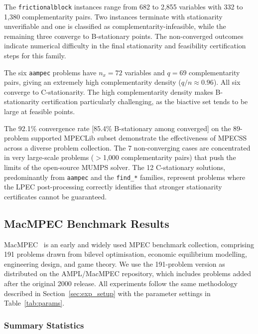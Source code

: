 The \texttt{frictionalblock} instances range from 682 to 2,855 variables
with 332 to 1,380 complementarity pairs.  Two instances terminate with
stationarity unverifiable and one is classified as complementarity-infeasible,
while the remaining three converge to B-stationary points.  The
non-converged outcomes indicate numerical difficulty in the final
stationarity and feasibility certification steps for this family.

The six \texttt{aampec} problems have $n_x = 72$ variables and $q = 69$
complementarity pairs, giving an extremely high complementarity
density ($q/n \approx 0.96$).  All six converge to C-stationarity.
The high complementarity density
makes B-stationarity certification particularly challenging, as the
biactive set tends to be large at feasible points.

The 92.1\% convergence rate [85.4\% B-stationary among converged] on the 89-problem supported MPECLib subset
demonstrate the effectiveness of MPECSS across a diverse problem collection.
The 7 non-converging cases are concentrated in very large-scale problems ($>$1,000
complementarity pairs) that push the limits of the open-source MUMPS solver.
The 12 C-stationary solutions, predominantly from \texttt{aampec} and
the \texttt{find\_*} families, represent problems where the LPEC post-processing
correctly identifies that stronger stationarity certificates cannot be
guaranteed.


\subsection{MacMPEC Benchmark Results}
\label{sec:macmpec}

MacMPEC~\cite{Leyffer2000} is an early and widely used MPEC
benchmark collection, comprising 191 problems drawn from bilevel
optimisation, economic equilibrium modelling, engineering design, and
game theory.  We use the 191-problem version as distributed on the
AMPL/MacMPEC repository, which includes problems added after the
original 2000 release.  All experiments follow the same methodology
described in Section~\ref{sec:exp_setup} with the parameter settings
in Table~\ref{tab:params}.

\subsubsection{Summary Statistics}
\label{sec:macmpec_summary}

